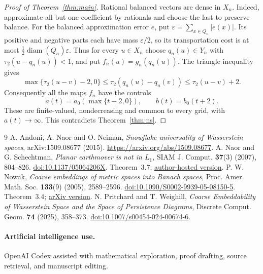 \documentclass[11pt]{article}
\theoremstyle{remark}
\begin{document}
\begin{proof}[Proof of Theorem~\ref{thm:main}]
Rational balanced vectors are dense in \(X_n\). Indeed, approximate all but one coefficient by rationals and choose the last to preserve balance. For the balanced approximation error \(e\), put \(\varepsilon=\sum_{x\in Q_n}|e(x)|\). Its positive and negative parts each have mass \(\varepsilon/2\), so its transportation cost is at most \(\frac12\operatorname{diam}(Q_n)\varepsilon\). Thus for every \(u\in X_n\) choose \(q_n(u)\in Y_n\) with \(\tau_2(u-q_n(u))<1\), and put \(f_n(u)=g_n(q_n(u))\). The triangle inequality gives
\[
 \max\{\tau_2(u-v)-2,0\}
 \le\tau_2(q_n(u)-q_n(v))
 \le\tau_2(u-v)+2.
\]
Consequently all the maps \(f_n\) have the controls
\[
 a(t)=a_0(\max\{t-2,0\}),\qquad b(t)=b_0(t+2).
\]
These are finite-valued, nondecreasing and common to every grid, with \(a(t)\to\infty\). This contradicts Theorem~\ref{thm:ns}.
\end{proof}

\begin{thebibliography}{9}
A. Andoni, A. Naor and O. Neiman,
\emph{Snowflake universality of Wasserstein spaces},
arXiv:1509.08677 (2015).
\url{https://arxiv.org/abs/1509.08677}.
A. Naor and G. Schechtman,
\emph{Planar earthmover is not in \(L_1\)},
SIAM J. Comput. \textbf{37}(3) (2007), 804--826.
\href{https://doi.org/10.1137/05064206X}{doi:10.1137/05064206X}.
Theorem~3.7; \href{https://web.math.princeton.edu/~naor/homepage%20files/planar-earthmover.pdf}{author-hosted version}.
P. W. Nowak,
\emph{Coarse embeddings of metric spaces into Banach spaces},
Proc. Amer. Math. Soc. \textbf{133}(9) (2005), 2589--2596.
\href{https://doi.org/10.1090/S0002-9939-05-08150-5}{doi:10.1090/S0002-9939-05-08150-5}.
Theorem~3.4; \href{https://arxiv.org/abs/math/0404401}{arXiv version}.
N. Pritchard and T. Weighill,
\emph{Coarse Embeddability of Wasserstein Space and the Space of Persistence Diagrams},
Discrete Comput. Geom. \textbf{74} (2025), 358--373.
\href{https://doi.org/10.1007/s00454-024-00674-6}{doi:10.1007/s00454-024-00674-6}.
\end{thebibliography}

\paragraph{Artificial intelligence use.}
OpenAI Codex assisted with mathematical exploration, proof drafting, source retrieval, and manuscript editing.
\end{document}
